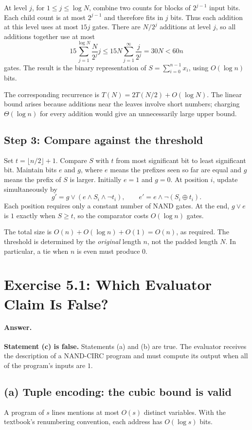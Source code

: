 \documentclass[UTF8,fontset=fandol,11pt,a4paper]{ctexart}
\begin{document}
At level $j$, for $1\le j\le\log N$, combine two counts for blocks of
$2^{j-1}$ input bits. Each child count is at most $2^{j-1}$ and therefore
fits in $j$ bits. Thus each addition at this level uses at most $15j$
gates. There are $N/2^j$ additions at level $j$, so all additions together
use at most
\[
 15\sum_{j=1}^{\log N}\frac{N}{2^j}j
 \le15N\sum_{j=1}^{\infty}\frac{j}{2^j}
 =30N<60n
\]
gates. The result is the binary representation of
$S=\sum_{i=0}^{n-1}x_i$, using $O(\log n)$ bits.

The corresponding recurrence is $T(N)=2T(N/2)+O(\log N)$.
The linear bound arises because additions near the leaves involve
short numbers; charging $\Theta(\log n)$ for every addition would
give an unnecessarily large upper bound.

\subsection*{Step 3: Compare against the threshold}
Set $t=\lfloor n/2\rfloor+1$. Compare $S$ with $t$ from most significant
bit to least significant bit. Maintain bits $e$ and $g$, where $e$
means the prefixes seen so far are equal and $g$ means the prefix of
$S$ is larger. Initially $e=1$ and $g=0$. At position $i$, update
simultaneously by
\[
 g'=g\lor(e\land S_i\land\neg t_i),\qquad
 e'=e\land\neg(S_i\oplus t_i).
\]
Each position requires only a constant number of NAND gates.
At the end, $g\lor e$ is $1$ exactly when $S\ge t$, so the comparator
costs $O(\log n)$ gates.

The total size is $O(n)+O(\log n)+O(1)=O(n)$, as required.
The threshold is determined by the \emph{original} length $n$, not the
padded length $N$. In particular, a tie when $n$ is even must produce $0$.

\section{Exercise 5.1: Which Evaluator Claim Is False?}

\paragraph{Answer.}
\textbf{Statement (c) is false.} Statements (a) and (b) are true.
The evaluator receives the description of a NAND-CIRC program and
must compute its output when all of the program's inputs are $1$.

\subsection*{(a) Tuple encoding: the cubic bound is valid}
A program of $s$ lines mentions at most $O(s)$ distinct variables.
With the textbook's renumbering convention, each address has
$O(\log s)$ bits.
\end{document}
